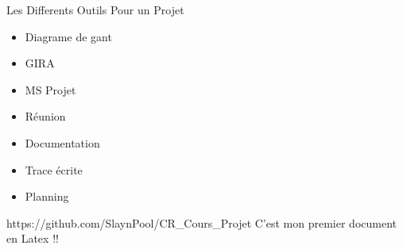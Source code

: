 \documentclass{resume} %
\begin{document}
\begin{rSection}{Les Differents Outils Pour un Projet}
\begin{itemize}
    \item Diagrame de gant
    \item GIRA
    \item MS Projet
    \item Réunion
    \item Documentation
    \item Trace écrite
    \item Planning 
\end{itemize}

\end{rSection}
https://github.com/SlaynPool/CR\_Cours\_Projet\newline
C'est mon premier document en Latex !! 
\end{document}
